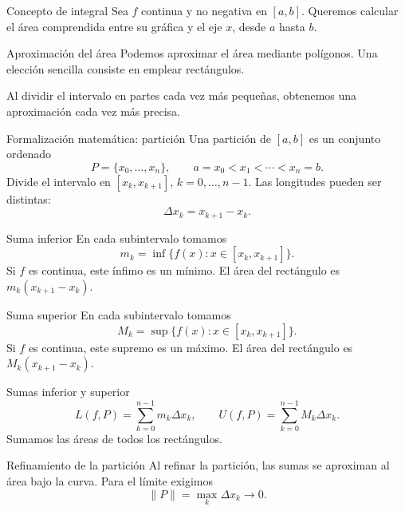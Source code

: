 \documentclass[main.tex]{subfiles}
\begin{document}
\graphicspath{{imagenes/tema4/}{../imagenes/tema4/}}



\begin{frame}{Concepto de integral}
Sea $f$ continua y no negativa en $[a,b]$. Queremos calcular el área comprendida entre su gráfica y el eje $x$, desde $a$ hasta $b$.
\end{frame}

\begin{frame}{Aproximación del área}
Podemos aproximar el área mediante polígonos. Una elección sencilla consiste en emplear rectángulos.\par\medskip Al dividir el intervalo en partes cada vez más pequeñas, obtenemos una aproximación cada vez más precisa.
\end{frame}

\begin{frame}{Formalización matemática: partición}
Una partición de $[a,b]$ es un conjunto ordenado\[P=\{x_0,\ldots,x_n\},\qquad a=x_0<x_1<\cdots<x_n=b.\]Divide el intervalo en $[x_k,x_{k+1}]$, $k=0,\ldots,n-1$. Las longitudes pueden ser distintas:\[\Delta x_k=x_{k+1}-x_k.\]
\end{frame}

\begin{frame}{Suma inferior}
En cada subintervalo tomamos\[m_k=\inf\{f(x):x\in[x_k,x_{k+1}]\}.\]Si $f$ es continua, este ínfimo es un mínimo. El área del rectángulo es $m_k(x_{k+1}-x_k)$.
\end{frame}

\begin{frame}{Suma superior}
En cada subintervalo tomamos\[M_k=\sup\{f(x):x\in[x_k,x_{k+1}]\}.\]Si $f$ es continua, este supremo es un máximo. El área del rectángulo es $M_k(x_{k+1}-x_k)$.
\end{frame}

\begin{frame}{Sumas inferior y superior}
\[L(f,P)=\sum_{k=0}^{n-1}m_k\Delta x_k,\qquad U(f,P)=\sum_{k=0}^{n-1}M_k\Delta x_k.\]Sumamos las áreas de todos los rectángulos.
\end{frame}

\begin{frame}{Refinamiento de la partición}
Al refinar la partición, las sumas se aproximan al área bajo la curva. Para el límite exigimos\[\|P\|=\max_k\Delta x_k\longrightarrow0.\]
\end{frame}
\end{document}

